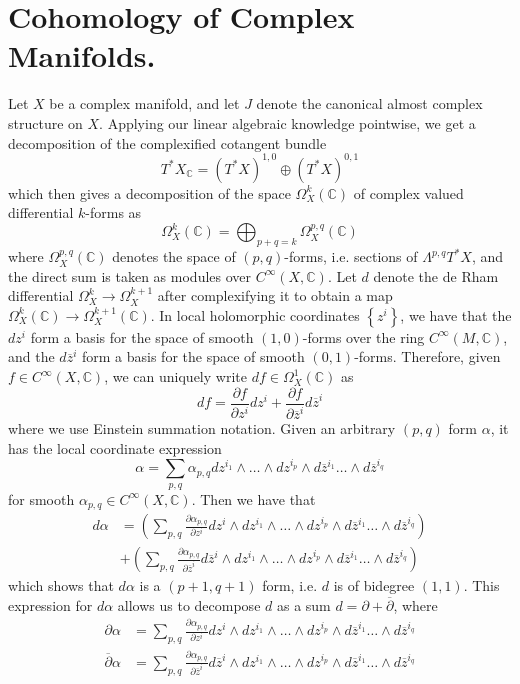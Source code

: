 \documentclass[psamsfonts, 12pt]{amsart}
\theoremstyle{definition}
\theoremstyle{remark}
\newcommand{\C}{\mathbb{C}}
\newcommand{\dbar}{\overline{\partial}}
\newcommand{\set}[1]{\left\lbrace #1 \right\rbrace}
\begin{document}
\section{Cohomology of Complex Manifolds.}
%
Let $X$ be a complex manifold, and let $J$ denote the canonical almost complex structure
on $X$. Applying our linear algebraic knowledge pointwise, we get a decomposition of
the complexified cotangent bundle
\[
T^*X_\C = (T^*X)^{1,0} \oplus (T^*X)^{0,1}
\]
%
which then gives a decomposition of the space $\Omega^k_X(\C)$ of complex valued
differential $k$-forms as
\[
\Omega^k_X(\C) = \bigoplus_{p+q=k}\Omega^{p,q}_X(\C)
\]
where $\Omega^{p,q}_X(\C)$ denotes the space of $(p,q)$-forms, i.e. sections of
$\Lambda^{p,q}T^*X$, and the direct sum is taken as modules over $C^\infty(X,\C)$.
Let $d$ denote the de Rham differential $\Omega^k_X \to \Omega^{k+1}_X$ after
complexifying it to obtain a map $\Omega^k_X(\C) \to \Omega^{k+1}_X(\C)$. In local
holomorphic coordinates $\set{z^i}$, we have that the $dz^i$ form a basis for the space
of smooth $(1,0)$-forms over the ring $C^\infty(M,\C)$, and the $d\overline{z}^i$ form a
basis for the space of smooth $(0,1)$-forms. Therefore, given $f \in C^\infty(X,\C)$, we
can uniquely write $df \in \Omega^1_X(\C)$ as
\[
df = \frac{\partial f}{\partial z^i}dz^i +
\frac{\partial f}{\partial\overline{z}^i}d\overline{z}^i
\]
where we use Einstein summation notation. Given an arbitrary $(p,q)$ form $\alpha$, it
has the local coordinate expression
\[
\alpha = \sum_{p,q} \alpha_{p,q} dz^{i_1} \wedge \ldots \wedge dz^{i_p} \wedge
d\overline{z}^{i_1}\ldots \wedge d\overline{z}^{i_q}
\]
for smooth $\alpha_{p,q} \in C^\infty(X,\C)$. Then we have that
%
\begin{align*}
d\alpha &= \left(\sum_{p,q}\frac{\partial\alpha_{p,q}}{\partial z^i} dz^i
\wedge dz^{i_1} \wedge \ldots \wedge dz^{i_p} \wedge
d\overline{z}^{i_1}\ldots \wedge d\overline{z}^{i_q}\right) \\[5pt]
&+ \left(
\sum_{p,q}\frac{\partial\alpha_{p,q}}{\partial \overline{z}^i} d\overline{z}^i
\wedge dz^{i_1} \wedge \ldots \wedge dz^{i_p} \wedge
d\overline{z}^{i_1}\ldots \wedge d\overline{z}^{i_q}
\right)
\end{align*}
%
which shows that $d\alpha$ is a $(p+1,q+1)$ form, i.e. $d$ is of bidegree $(1,1)$. This
expression for $d\alpha$ allows us to decompose $d$ as a sum $d = \partial + \dbar$,
where
%
\begin{align*}
\partial\alpha &= \sum_{p,q}\frac{\partial\alpha_{p,q}}{\partial z^i} dz^i
\wedge dz^{i_1} \wedge \ldots \wedge dz^{i_p} \wedge
d\overline{z}^{i_1}\ldots \wedge d\overline{z}^{i_q} \\[5pt]
\dbar\alpha &= \sum_{p,q}\frac{\partial\alpha_{p,q}}{\partial \overline{z}^i}
d\overline{z}^i \wedge dz^{i_1} \wedge \ldots \wedge dz^{i_p} \wedge
d\overline{z}^{i_1}\ldots \wedge d\overline{z}^{i_q}
\end{align*}
\end{document}
